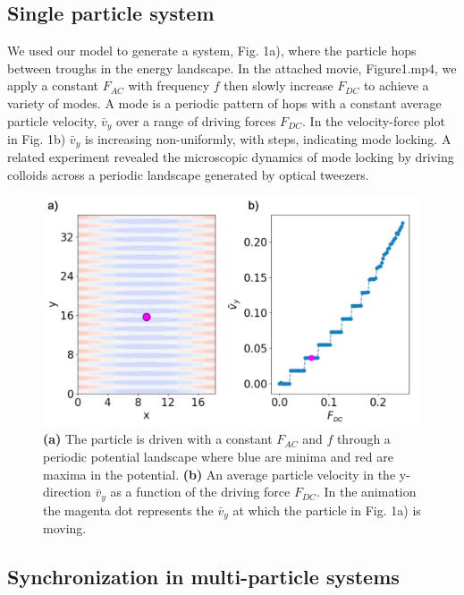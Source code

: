 \documentclass[prb,preprint]{revtex4}
\begin{document}
\subsection{Single particle system}  %

We used our model to generate a system, Fig. 1a), where the particle hops between troughs in the energy landscape. In the attached movie, Figure1.mp4, we apply a constant $F_{AC}$ with frequency $f$ then slowly increase $F_{DC}$  to achieve a variety of modes. A mode is a periodic pattern of hops with a constant average particle velocity, $\bar{v}_{y}$ over a range of driving forces $F_{DC}$. In the velocity-force plot in Fig. 1b) $\bar{v}_{y}$ is increasing non-uniformly, with steps, indicating mode locking. A related experiment \cite{juniper2015} revealed the microscopic dynamics of mode locking by driving colloids across a periodic landscape generated by optical tweezers.

\begin{center}
\begin{figure}[h!]
\centering
\includegraphics[scale=.25]{single}
\caption{\textbf{(a)} The particle is driven with a constant $F_{AC}$ and $f$ through a periodic potential landscape where blue are minima and red are maxima in the potential. \textbf{(b)} An average particle velocity in the y-direction $\bar{v}_{y}$ as a function of the driving force $F_{DC}$. In the animation the magenta dot represents the $\bar{v}_{y}$ at which the particle in Fig. 1a) is moving.}
\end{figure}
\end{center}

\subsection{Synchronization in multi-particle systems}
\label{sec:sync}
\end{document}
